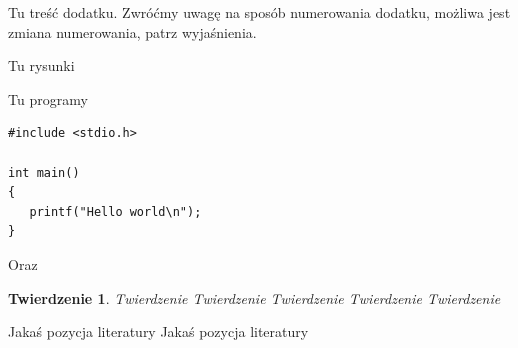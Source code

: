 \documentclass[twoside]{projektInzynierskiMS1}
\newtheorem{tw}{Twierdzenie}%
\begin{document}

Tu treść dodatku. Zwróćmy uwagę na sposób numerowania dodatku, 
możliwa jest zmiana numerowania, patrz wyjaśnienia.
          

Tu rysunki


Tu programy

\begin{verbatim}
#include <stdio.h>

int main()
{
   printf("Hello world\n");
}
\end{verbatim}

\noindent
Oraz 

\bigskip

\vrule\hspace{10pt}\begin{minipage}{10cm}
\end{minipage}

\begin{tw}
Twierdzenie Twierdzenie Twierdzenie Twierdzenie Twierdzenie 
\end{tw}
\begin{thebibliography}{12}

 Jakaś pozycja literatury
 Jakaś pozycja literatury

\end{thebibliography}
\end{document}
